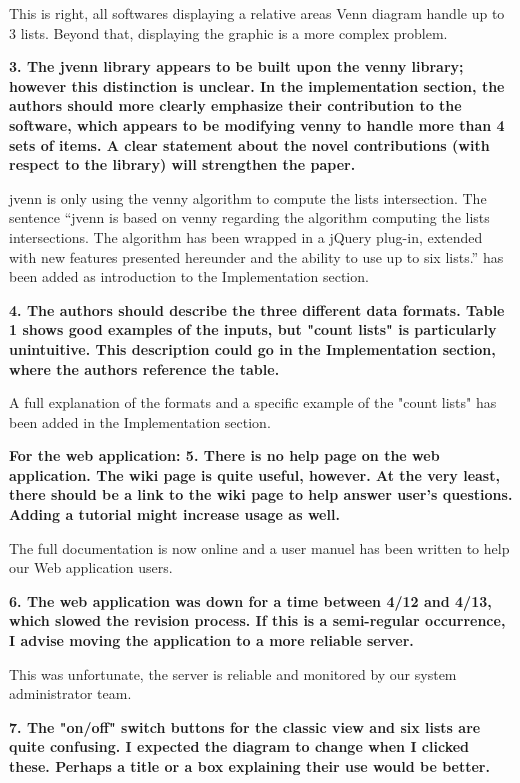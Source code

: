 \documentclass[10pt,stdletter,dateno,sigleft]{newlfm} %
\begin{document}
\begin{newlfm}
This is right, all softwares displaying a relative areas Venn diagram handle up
to 3 lists. Beyond that, displaying the graphic is a more complex problem.

\textbf{3. The jvenn library appears to be built upon the venny library;
however this distinction is unclear. In the implementation section,
the authors should more clearly emphasize their contribution to the
software, which appears to be modifying venny to handle more than 4
sets of items. A clear statement about the novel contributions (with
respect to the library) will strengthen the paper.}

jvenn is only using the venny algorithm to compute the lists intersection.
The sentence ``jvenn is based on venny regarding the algorithm computing the
lists intersections. The algorithm has been wrapped in a jQuery plug-in,
extended with new features presented hereunder and the ability to use up to six
lists.'' has been added as introduction to the Implementation section.


\textbf{4. The authors should describe the three different data formats.
Table 1 shows good examples of the inputs, but "count lists" is
particularly unintuitive. This description could go in the
Implementation section, where the authors reference the table.}

A full explanation of the formats and a specific example of the "count lists"
has been added in the Implementation section.

\textbf{For the web application: 5. There is no help page on the web
application. The wiki page is quite useful, however. At the very least, there
should be a link to the wiki page to help answer user's questions. Adding a 
tutorial might increase usage as well.}

The full documentation is now online and a user manuel has been written to help
our Web application users.

\textbf{6. The web application was down for a time between 4/12 and 4/13,
which slowed the revision process. If this is a semi-regular
occurrence, I advise moving the application to a more reliable server.}

This was unfortunate, the server is reliable and monitored by our system
administrator team.

\textbf{7. The "on/off" switch buttons for the classic view and six lists are
quite confusing. I expected the diagram to change when I clicked
these. Perhaps a title or a box explaining their use would be better.}


\end{newlfm}
\end{document}
